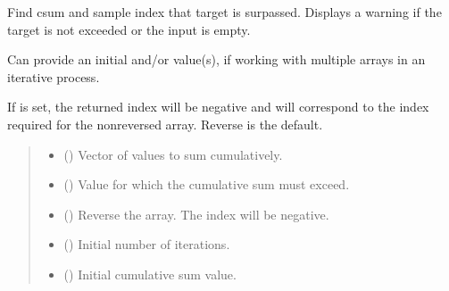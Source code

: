 \documentclass[letterpaper,10pt,english]{sphinxmanual}
\begin{document}
\begin{fulllineitems}
\label{\detokenize{misc:glomar_gridding.covariance_tools.csum_up_to_val}}
\pysigstartsignatures
\pysiglinewithargsret
{}
{\sphinxparamcomma {}\sphinxparamcomma {}\sphinxparamcomma {}\sphinxparamcomma {}}
{}
\pysigstopsignatures
\sphinxAtStartPar
Find csum and sample index that target is surpassed. Displays a warning if
the target is not exceeded or the input  is empty.

\sphinxAtStartPar
Can provide an initial  and/or  value(s), if working with
multiple arrays in an iterative process.

\sphinxAtStartPar
If  is set, the returned index will be negative and will correspond
to the index required for the non\sphinxhyphen{}reversed array. Reverse is the default.
\begin{quote}\begin{description}
\begin{itemize}
\item {}
\sphinxAtStartPar
{} () \textendash{} Vector of values to sum cumulatively.

\item {}
\sphinxAtStartPar
{} () \textendash{} Value for which the cumulative sum must exceed.

\item {}
\sphinxAtStartPar
{} () \textendash{} Reverse the array. The index will be negative.

\item {}
\sphinxAtStartPar
{} () \textendash{} Initial number of iterations.

\item {}
\sphinxAtStartPar
{} () \textendash{} Initial cumulative sum value.


\end{itemize}
\end{description}
\end{quote}
\end{fulllineitems}
\end{document}
